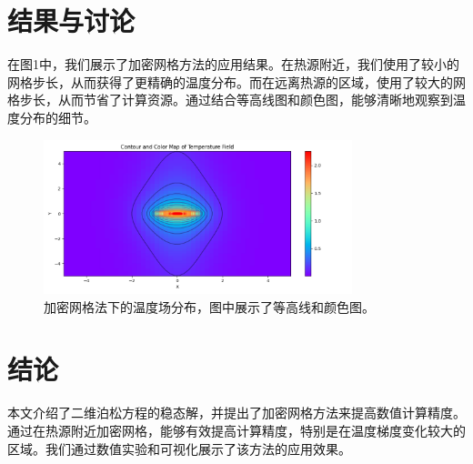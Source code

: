 \documentclass[12pt]{article}
\begin{document}
\section{结果与讨论}
在图1中，我们展示了加密网格方法的应用结果。在热源附近，我们使用了较小的网格步长，从而获得了更精确的温度分布。而在远离热源的区域，使用了较大的网格步长，从而节省了计算资源。通过结合等高线图和颜色图，能够清晰地观察到温度分布的细节。

\begin{figure}[h!]
    \centering
    \includegraphics[width=0.8\textwidth]{temperature.png}
    \caption{加密网格法下的温度场分布，图中展示了等高线和颜色图。}
    \label{fig:temperature_field}
\end{figure}

\section{结论}
本文介绍了二维泊松方程的稳态解，并提出了加密网格方法来提高数值计算精度。通过在热源附近加密网格，能够有效提高计算精度，特别是在温度梯度变化较大的区域。我们通过数值实验和可视化展示了该方法的应用效果。
\end{document}
